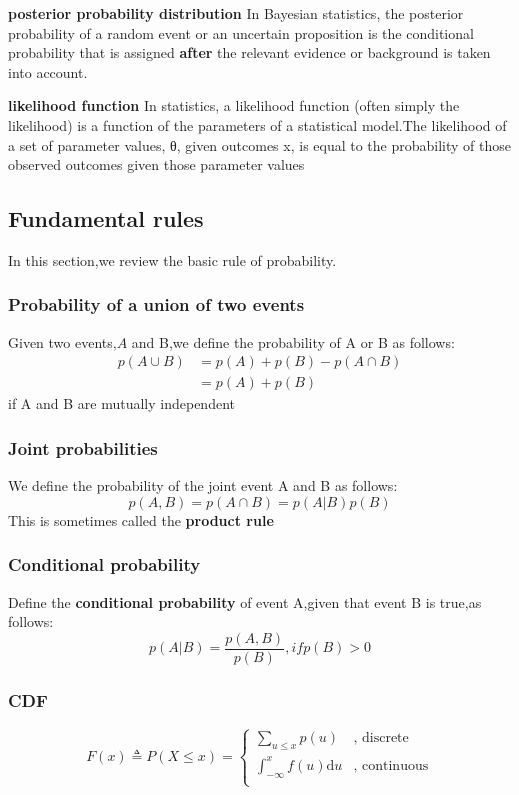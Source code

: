 \textbf{posterior probability distribution}
In Bayesian statistics, the posterior probability of a random event or an uncertain proposition is the conditional probability that is assigned \textbf{after} the relevant evidence or background is taken into account.

\textbf{likelihood function}
In statistics, a likelihood function (often simply the likelihood) is a function of the parameters of a statistical model.The likelihood of a set of parameter values, θ, given outcomes x, is equal to the probability of those observed outcomes given those parameter values

\subsection{Fundamental rules}
In this section,we review the basic rule of probability.
\subsubsection{Probability of a union of two events}
Given two events,$A$ and B,we define the probability of A or B as follows:
\begin{align}
p(A\cup B)& = p(A) + p(B) - p(A\cap B)	\\
		  & = p(A) + p(B)
\end{align}
if A and B are mutually independent 


\subsubsection{Joint probabilities}
We define the probability of the joint event A and B as follows:
\begin{equation}
p(A,B) = p(A\cap B) = p(A|B)p(B)
\end{equation}
This is sometimes called the \textbf{product rule}
\subsubsection{Conditional probability}
Define the \textbf{conditional probability} of event A,given that event B is true,as follows:
\begin{equation}
p(A|B)= \frac{p(A,B)}{p(B)},if p(B) > 0
\end{equation}
\subsubsection{CDF}

\begin{equation}
F(x) \triangleq P(X \leq x)=\begin{cases}
\sum_{u \leq x}p(u) & \text{, discrete}\\
\int_{-\infty}^{x} f(u)\mathrm{d}u & \text{, continuous}\\
\end{cases}
\end{equation}


